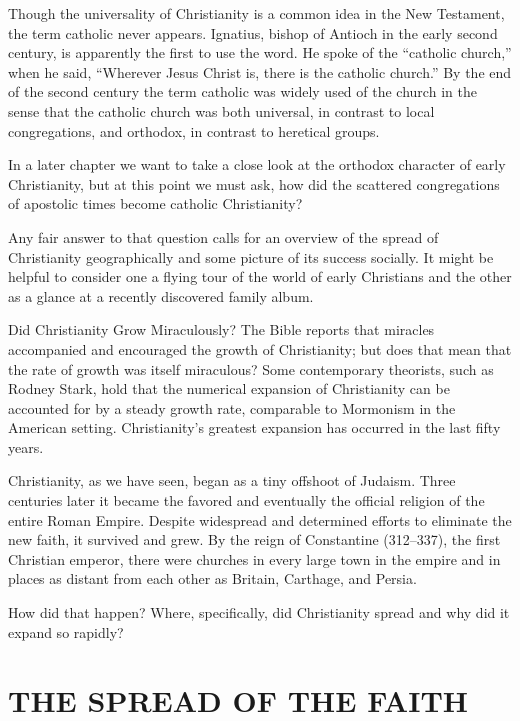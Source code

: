 Though the universality of Christianity is a common idea in the New Testament, the term catholic
never appears. Ignatius, bishop of Antioch in the early second century, is apparently the first to
use the word. He spoke of the “catholic church,” when he said, “Wherever Jesus Christ is, there is
the catholic church.” By the end of the second century the term catholic was widely used of the
church in the sense that the catholic church was both universal, in contrast to local congregations,
and orthodox, in contrast to heretical groups.

In a later chapter we want to take a close look at the orthodox character of early Christianity, but
at this point we must ask, how did the scattered congregations of apostolic times become catholic
Christianity?

Any fair answer to that question calls for an overview of the spread of Christianity geographically
and some picture of its success socially. It might be helpful to consider one a flying tour of the
world of early Christians and the other as a glance at a recently discovered family album.

\begin{sidebar}{Did Christianity Grow Miraculously?}
The Bible reports that miracles accompanied and encouraged the growth of Christianity; but does that
mean that the rate of growth was itself miraculous? Some contemporary theorists, such as Rodney
Stark, hold that the numerical expansion of Christianity can be accounted for by a steady growth
rate, comparable to Mormonism in the American setting. Christianity’s greatest expansion has
occurred in the last fifty years.
\end{sidebar}

Christianity, as we have seen, began as a tiny offshoot of Judaism. Three centuries later it became
the favored and eventually the official religion of the entire Roman Empire. Despite widespread and
determined efforts to eliminate the new faith, it survived and grew. By the reign of Constantine
(312–337), the first Christian emperor, there were churches in every large town in the empire and in
places as distant from each other as Britain, Carthage, and Persia.

How did that happen? Where, specifically, did Christianity spread and why did it expand so rapidly?

\section{THE SPREAD OF THE FAITH}

